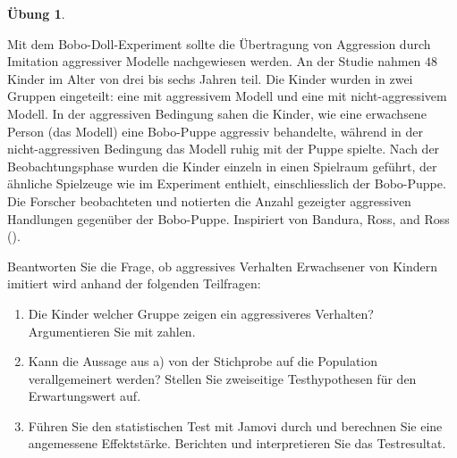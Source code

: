 \documentclass[
]{book}
\providecommand{\tightlist}{%
  \setlength{\itemsep}{0pt}\setlength{\parskip}{0pt}}
\theoremstyle{definition}
\theoremstyle{definition}
\theoremstyle{definition}
\newtheorem{exercise}{Übung}[chapter]
\theoremstyle{definition}
\theoremstyle{remark}
\begin{document}
\begin{exercise}
\protect\hypertarget{exr:bobo2groups}{}\label{exr:bobo2groups}\leavevmode

Mit dem Bobo-Doll-Experiment sollte die Übertragung von Aggression durch Imitation aggressiver Modelle nachgewiesen werden. An der Studie nahmen \(48\) Kinder im Alter von drei bis sechs Jahren teil. Die Kinder wurden in zwei Gruppen eingeteilt: eine mit aggressivem Modell und eine mit nicht-aggressivem Modell. In der aggressiven Bedingung sahen die Kinder, wie eine erwachsene Person (das Modell) eine Bobo-Puppe aggressiv behandelte, während in der nicht-aggressiven Bedingung das Modell ruhig mit der Puppe spielte. Nach der Beobachtungsphase wurden die Kinder einzeln in einen Spielraum geführt, der ähnliche Spielzeuge wie im Experiment enthielt, einschliesslich der Bobo-Puppe. Die Forscher beobachteten und notierten die Anzahl gezeigter aggressiven Handlungen gegenüber der Bobo-Puppe.
Inspiriert von Bandura, Ross, and Ross ().

Beantworten Sie die Frage, ob aggressives Verhalten Erwachsener von Kindern imitiert wird anhand der folgenden Teilfragen:

\begin{enumerate}
\def\labelenumi{\alph{enumi})}
\tightlist
\item
  Die Kinder welcher Gruppe zeigen ein aggressiveres Verhalten? Argumentieren Sie mit zahlen.
\item
  Kann die Aussage aus a) von der Stichprobe auf die Population verallgemeinert werden? Stellen Sie zweiseitige Testhypothesen für den Erwartungswert auf.
\item
  Führen Sie den statistischen Test mit Jamovi durch und berechnen Sie eine angemessene Effektstärke. Berichten und interpretieren Sie das Testresultat.
\end{enumerate}

\end{exercise}
\end{document}
